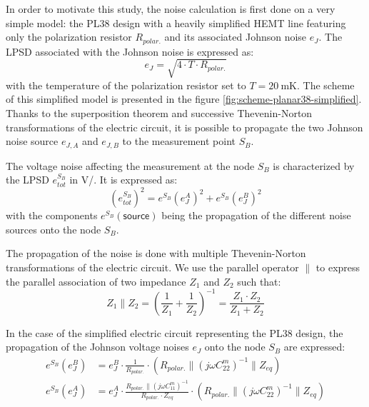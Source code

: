 In order to motivate this study, the noise calculation is first done on a very simple model: the PL38 design with a heavily simplified HEMT line featuring only the polarization resistor $R_{polar.}$ and its associated Johnson noise $e_J$. The LPSD associated with the Johnson noise is expressed as:
\begin{equation}
e_J = \sqrt{4 \cdot T \cdot R_{polar.}}
\end{equation}
with the temperature of the polarization resistor set to $T=\SI{20}{\milli\kelvin}$. The scheme of this simplified model is presented in the figure \ref{fig:scheme-planar38-simplified}. Thanks to the superposition theorem and successive Thevenin-Norton transformations of the electric circuit, it is possible to propagate the two Johnson noise source $e_{J,A}$ and $e_{J,B}$ to the measurement point $S_B$. 

The voltage noise affecting the measurement at the node $S_B$ is characterized by the LPSD $e_{tot}^{S_B}$ in \si[per-mode=symbol]{\volt\per\sqrthz}. It is expressed as:
\begin{equation}
\left( e_{tot}^{S_B} \right)^2
=
e^{S_B} \left( e_J^A \right)^2
+
e^{S_B} \left( e_J^B \right)^2
\end{equation}
with the components $e^{S_B} (\textsf{source})$ being the propagation of the different noise sources onto the node $S_B$.

The propagation of the noise is done with multiple Thevenin-Norton transformations of the electric circuit. We use the parallel operator $\parallel$ to express the parallel association of two impedance $Z_1$ and $Z_2$ such that:
\begin{equation}
Z_1 \parallel Z_2 = \left( \frac{1}{Z_1} + \frac{1}{Z_2} \right)^{-1} = \frac{Z_1 \cdot Z_2}{Z_1 + Z_2}
\end{equation}

In the case of the simplified electric circuit representing the PL38 design, the propagation of the Johnson voltage noises $e_J$ onto the node $S_B$ are expressed:
\begin{align}
e^{S_B} \left( e_J^B \right)
&=
e_J^B
\cdot 
\frac{1}{R_{polar.}}
\cdot
\left( R_{polar.} \parallel (j\omega C_{22}^m)^{-1} \parallel Z_{eq} \right)
\\
e^{S_B} \left( e_J^A \right)
&=
e_J^A
\cdot
\frac{R_{polar.} \parallel (j\omega C_{11}^m)^{-1} }{R_{polar.} \cdot Z_{eq}}
\cdot
\left( R_{polar.} \parallel (j\omega C_{22}^m)^{-1} \parallel Z_{eq} \right)
\end{align}

